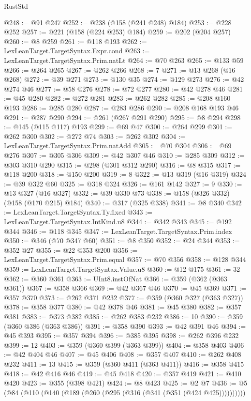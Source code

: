 \begin{lexlean}{RustStd}
\begin{coremodule}
@248 := @91 @247
@252 := @238 (@158 (@241 @248) @184)
@253 := @228 @252
@257 := @221 (@158 (@224 @253) @184)
@259 := @202 (@204 @257)
@260 := @8 @259
@261 := @118 @193
@262 := LexLeanTarget.TargetSyntax.Expr.cond
@263 := LexLeanTarget.TargetSyntax.Prim.natLt
@264 := @70 @263
@265 := @133 @59
@266 := @264 @265
@267 := @262 @266
@268 := 7
@271 := @13 @268 (@16 @268)
@272 := @39 @271
@273 := @130 @35
@274 := @129 @273
@276 := @42 @274 @46
@277 := @58 @276
@278 := @72 @277
@280 := @42 @278 @46
@281 := @45 @280
@282 := @272 @281
@283 := @262 @282
@285 := @208 @160 @193
@286 := @285 @280
@287 := @283 @286
@290 := @208 @168 @193 @46
@291 := @287 @290
@294 := @261 (@267 @291 @290)
@295 := @8 @294
@298 := @145 (@115 @117) @193
@299 := @69 @47
@300 := @264 @299
@301 := @262 @300
@302 := @272 @74
@303 := @262 @302
@304 := LexLeanTarget.TargetSyntax.Prim.natAdd
@305 := @70 @304
@306 := @69 @276
@307 := @305 @306
@309 := @42 @307 @46
@310 := @285 @309
@312 := @303 @310 @290
@315 := @298 (@301 @312 @290)
@316 := @8 @315
@317 := @118 @200
@318 := @150 @200
@319 := 8
@322 := @13 @319 (@16 @319)
@324 := @39 @322 @60
@325 := @318 @324
@326 := @161 @142
@327 := 9
@330 := @13 @327 (@16 @327)
@332 := @39 @330 @73
@338 := @158 (@326 @332) (@158 (@170 @215) @184)
@340 := @317 (@325 @338)
@341 := @8 @340
@342 := LexLeanTarget.TargetSyntax.Ty.fixed
@343 := LexLeanTarget.TargetSyntax.IntKind.u8
@344 := @342 @343
@345 := @192 @344
@346 := @118 @345
@347 := LexLeanTarget.TargetSyntax.Prim.index
@350 := @346 (@70 @347 @60)
@351 := @8 @350
@352 := @24 @344
@353 := @352 @27
@355 := @22 @353 @200
@356 := LexLeanTarget.TargetSyntax.Prim.equal
@357 := @70 @356
@358 := @128 @344
@359 := LexLeanTarget.TargetSyntax.Value.u8
@360 := @12 @175
@361 := 32
@362 := @360 @361
@363 := UInt8.instOfNat
@366 := @359 (@362 (@363 @361))
@367 := @358 @366
@369 := @42 @367 @46
@370 := @45 @369
@371 := @357 @370
@373 := @262 @371 @232
@377 := @359 (@360 @327 (@363 @327))
@378 := @358 @377
@380 := @42 @378 @46
@381 := @45 @380
@382 := @357 @381
@383 := @373 @382
@385 := @262 @383 @232
@386 := 10
@390 := @359 (@360 @386 (@363 @386))
@391 := @358 @390
@393 := @42 @391 @46
@394 := @45 @393
@395 := @357 @394
@396 := @385 @395
@398 := @262 @396 @232
@399 := 12
@403 := @359 (@360 @399 (@363 @399))
@404 := @358 @403
@406 := @42 @404 @46
@407 := @45 @406
@408 := @357 @407
@410 := @262 @408 @232
@411 := 13
@415 := @359 (@360 @411 (@363 @411))
@416 := @358 @415
@418 := @42 @416 @46
@419 := @45 @418
@420 := @357 @419
@421 := @410 @420
@423 := @355 (@398 @421)
@424 := @8 @423
@425 := @2 @7
@436 := @5 (@84 (@110 (@140 (@189 (@260 (@295 (@316 (@341 (@351 (@424 @425))))))))))

\end{coremodule}
\end{lexlean}
